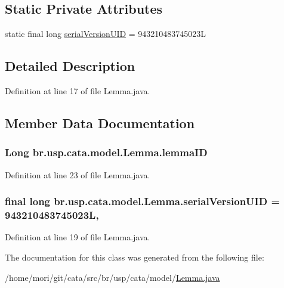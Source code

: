 \subsection*{Static Private Attributes}
\begin{DoxyCompactItemize}
\item 
static final long \hyperlink{classbr_1_1usp_1_1cata_1_1model_1_1_lemma_ad809ad45e29ded2fb804a16d457c9b5e}{serial\+Version\+U\+I\+D} = 943210483745023\+L
\end{DoxyCompactItemize}


\subsection{Detailed Description}


Definition at line 17 of file Lemma.\+java.



\subsection{Member Data Documentation}
\hypertarget{classbr_1_1usp_1_1cata_1_1model_1_1_lemma_ae78ce11fd795b4348b07f66c823ee813}{
\subsubsection[{lemma\+I\+D}]{\setlength{\rightskip}{0pt plus 5cm}Long br.\+usp.\+cata.\+model.\+Lemma.\+lemma\+I\+D\hspace{0.3cm}{\ttfamily [private]}}}\label{classbr_1_1usp_1_1cata_1_1model_1_1_lemma_ae78ce11fd795b4348b07f66c823ee813}


Definition at line 23 of file Lemma.\+java.

\hypertarget{classbr_1_1usp_1_1cata_1_1model_1_1_lemma_ad809ad45e29ded2fb804a16d457c9b5e}{
\subsubsection[{serial\+Version\+U\+I\+D}]{\setlength{\rightskip}{0pt plus 5cm}final long br.\+usp.\+cata.\+model.\+Lemma.\+serial\+Version\+U\+I\+D = 943210483745023\+L\hspace{0.3cm}{\ttfamily [static]}, {\ttfamily [private]}}}\label{classbr_1_1usp_1_1cata_1_1model_1_1_lemma_ad809ad45e29ded2fb804a16d457c9b5e}


Definition at line 19 of file Lemma.\+java.



The documentation for this class was generated from the following file\+:\begin{DoxyCompactItemize}
\item 
/home/mori/git/cata/src/br/usp/cata/model/\hyperlink{_lemma_8java}{Lemma.\+java}\end{DoxyCompactItemize}
